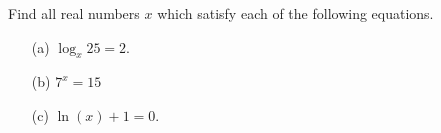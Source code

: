 \message{ !name(Breakout Session 1 Solutions.tex)}\documentclass[nooutcomes]{ximera}
\begin{document}
\begin{problem}
  \label{problem:solving-logarithmic-exponential-equations}
  Find all real numbers $x$ which satisfy each of the following equations.
  \begin{itemize}
    \item[(a)]
      $\log_x 25 = 2$.

    \item[(b)]
      $7^x = 15$

    \item[(c)]
      $\ln(x) + 1 = 0$.
  \end{itemize}
\end{problem}
\end{document}
